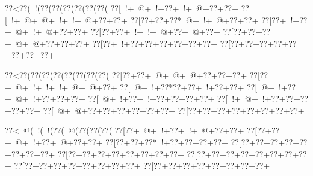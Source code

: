 \vbox{\vbox{\goo
\hbox{\0??<\0??(\- !(\0??(\0??(\0??(\0??(\0??(\0??(}
\hbox{\0??[\- !+\- @+\- !+\0??+\- !+\- @+\0??+\0??+}
\hbox{\0??[\- !+\- @+\- @+\- !+\- !+\- @+\0??+\0??+}
\hbox{\0??[\0??+\0??+\0??*\- @+\- !+\- @+\0??+\0??+}
\hbox{\0??[\0??+\- !+\0??+\- @+\- !+\- @+\0??+\0??+}
\hbox{\0??[\0??+\0??+\- !+\- !+\- @+\0??+\- @+\0??+}
\hbox{\0??[\0??+\0??+\0??+\- @+\- @+\0??+\0??+\0??+}
\hbox{\0??[\0??+\- !+\0??+\0??+\0??+\0??+\0??+\0??+}
\hbox{\0??[\0??+\0??+\0??+\0??+\0??+\0??+\0??+\0??+}
\smallskip
}
}
\hfil\break


\vbox{\vbox{\goo
\hbox{\0??<\0??(\0??(\0??(\0??(\0??(\0??(\0??(\0??(}
\hbox{\0??[\0??+\0??+\- @+\- @+\- @+\0??+\0??+\0??+}
\hbox{\0??[\0??+\- @+\- !+\- !+\- !+\- @+\- @+\0??+}
\hbox{\0??[\- @+\- !+\0??*\0??+\0??+\- !+\0??+\0??+}
\hbox{\0??[\- @+\- !+\0??+\- @+\- !+\0??+\0??+\0??+}
\hbox{\0??[\- @+\- !+\0??+\- !+\0??+\0??+\0??+\0??+}
\hbox{\0??[\- !+\- @+\- !+\0??+\0??+\0??+\0??+\0??+}
\hbox{\0??[\- @+\- @+\0??+\0??+\0??+\0??+\0??+\0??+}
\hbox{\0??[\0??+\0??+\0??+\0??+\0??+\0??+\0??+\0??+}
\smallskip
}
}
\hfil\break


\vbox{\vbox{\goo
\hbox{\0??<\- @(\- !(\- !(\0??(\- @(\0??(\0??(\0??(}
\hbox{\0??[\0??+\- @+\- !+\0??+\- !+\- @+\0??+\0??+}
\hbox{\0??[\0??+\0??+\- @+\- !+\0??+\- @+\0??+\0??+}
\hbox{\0??[\0??+\0??+\0??*\- !+\0??+\0??+\0??+\0??+}
\hbox{\0??[\0??+\0??+\0??+\0??+\0??+\0??+\0??+\0??+}
\hbox{\0??[\0??+\0??+\0??+\0??+\0??+\0??+\0??+\0??+}
\hbox{\0??[\0??+\0??+\0??+\0??+\0??+\0??+\0??+\0??+}
\hbox{\0??[\0??+\0??+\0??+\0??+\0??+\0??+\0??+\0??+}
\hbox{\0??[\0??+\0??+\0??+\0??+\0??+\0??+\0??+\0??+}
\smallskip
}
}
\hfil\break


\bye
